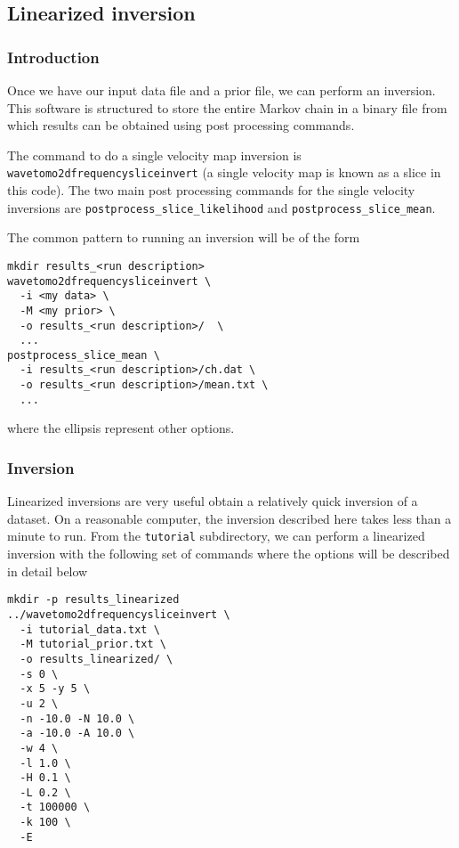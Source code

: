 \documentclass[a4paper,12pt]{article}
\begin{document}
\subsection{Linearized inversion}
\label{sec:tutoriallinearized}

\subsubsection{Introduction}

Once we have our input data file and a prior file, we can perform an
inversion. This software is structured to store the entire Markov
chain in a binary file from which results can be obtained using
post processing commands.

The command to do a single velocity map inversion is {\tt wavetomo2dfrequencysliceinvert}
(a single velocity map is known as a slice in this code). The
two main post processing commands for the single velocity inversions
are {\tt postprocess\_slice\_likelihood} and {\tt postprocess\_slice\_mean}.

The common pattern to running an inversion will be of the form

\begin{verbatim}
mkdir results_<run description>
wavetomo2dfrequencysliceinvert \
  -i <my data> \
  -M <my prior> \
  -o results_<run description>/  \
  ...
postprocess_slice_mean \
  -i results_<run description>/ch.dat \
  -o results_<run description>/mean.txt \
  ...
\end{verbatim}

where the ellipsis represent other options.

\subsubsection{Inversion}

Linearized inversions are very useful obtain a relatively quick inversion of a dataset.
On a reasonable computer, the inversion described here takes less than a minute to run.
From the {\tt tutorial} subdirectory, we can perform a linearized inversion with the
following set of commands where the options will be described in detail below

\begin{verbatim}
mkdir -p results_linearized
../wavetomo2dfrequencysliceinvert \
  -i tutorial_data.txt \
  -M tutorial_prior.txt \
  -o results_linearized/ \
  -s 0 \
  -x 5 -y 5 \
  -u 2 \
  -n -10.0 -N 10.0 \
  -a -10.0 -A 10.0 \
  -w 4 \
  -l 1.0 \
  -H 0.1 \
  -L 0.2 \
  -t 100000 \
  -k 100 \
  -E
\end{verbatim}
\end{document}
